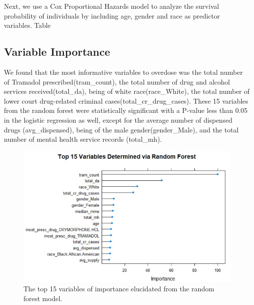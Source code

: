 \documentclass[twoside,10.5pt]{article}
\begin{document}
\begin{table}[h!]
  \begin{center}
    \caption{Probability of survival by Race}
    \label{tab:km_race}
  \end{center}
\end{table}

Next, we use a Cox Proportional Hazards model to analyze the survival probability of individuals by including age, gender and race as predictor variables. Table 

\subsection{Variable Importance}
We found that the most informative variables to overdose was the total number of Tramadol prescribed(tram\_count), the total number of drug and alcohol services received(total\_da), being of white race(race\_White), the total number of lower court drug-related criminal cases(total\_cr\_drug\_cases). 
These 15 variables from the random forest were statistically significant with a P-value less than 0.05 in the logistic regression as well, except for the average number of dispensed drugs (avg\_dispensed), being of the male gender(gender\_Male), and the total number of mental health service records (total\_mh).

\begin{figure}[h!]
\centering
\includegraphics[width=12cm]{images/variable_importance.JPG}
\caption{The top 15 variables of importance elucidated from the random forest model.}
\label{fig:var_importance}
\end{figure}
\end{document}

